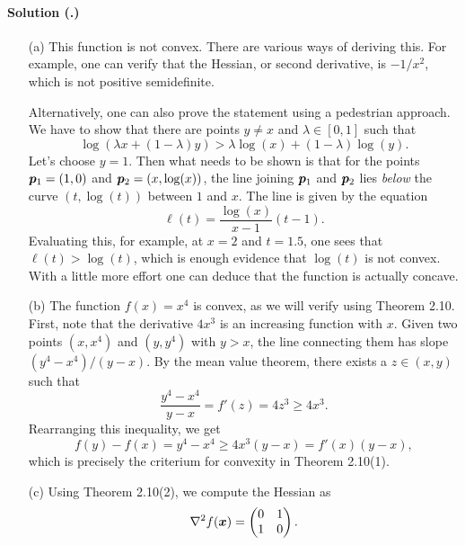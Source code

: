 \documentclass{article}
\newcounter{problemSheetNumber}
\newcounter{problems}
\renewcommand{\solution}[1]{\paragraph{Solution (\theproblemSheetNumber.\theproblems)}\addtocounter{problems}{1}\label{#1}}
\begin{document}
\solution{pr:2}
\begin{itemize}
 \item[(a)] This function is not convex. There are various ways of deriving this. For example, one can verify that the Hessian, or second derivative, is $-1/x^2$, which is not positive semidefinite. 
 
 Alternatively, one can also prove the statement using a pedestrian approach. We have to show that there are points $y\neq x$ and $\lambda \in [0,1]$ such that
 \begin{equation*}
  \log(\lambda x+(1-\lambda)y) > \lambda \log(x)+(1-\lambda)\log(y).
 \end{equation*}
 Let's choose $y=1$. Then what needs to be shown is that for the points $\bm{p}_1=(1,0)$ and $\bm{p}_2=(x,\log(x))$,
 the line joining $\bm{p}_1$ and $\bm{p}_2$ lies {\em below} the curve $(t,\log(t))$ between $1$ and $x$. The line is given by the equation
 \begin{equation*}
  \ell(t) = \frac{\log(x)}{x-1}(t-1).
 \end{equation*}
 Evaluating this, for example, at $x=2$ and $t=1.5$, one sees that $\ell(t)>\log(t)$, which is enough evidence that $\log(t)$ is not convex.
 With a little more effort one can deduce that the function is actually concave.
\item[(b)] The function $f(x)=x^4$ is convex, as we will verify using Theorem 2.10. First, note that the derivative $4x^3$ is an increasing function with $x$. 
Given two points $(x,x^4)$ and $(y,y^4)$ with $y>x$, the line connecting them has slope $(y^4-x^4)/(y-x)$. By the mean value theorem, there exists a $z\in (x,y)$ such that
\begin{equation*}
 \frac{y^4-x^4}{y-x} = f'(z) = 4z^3 \geq 4x^3.
\end{equation*}
Rearranging this inequality, we get
\begin{equation*}
 f(y)-f(x) = y^4-x^4 \geq 4x^3(y-x) = f'(x)(y-x),
\end{equation*}
which is precisely the criterium for convexity in Theorem 2.10(1).
\item[(c)] Using Theorem 2.10(2), we compute the Hessian as
\begin{equation*}
 \nabla^2f(\bm{x}) = \begin{pmatrix}
                       0 & 1\\
                       1 & 0
                      \end{pmatrix}.
\end{equation*}

\end{itemize}
\end{document}
